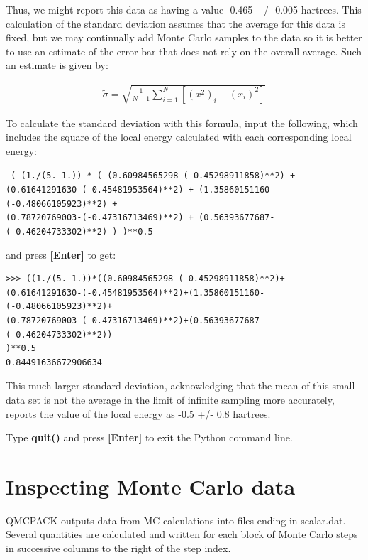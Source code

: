 Thus, we might report this data as having a value -0.465 +/- 0.005 hartrees.
This calculation of the standard deviation assumes that the average for this
data is fixed, but we may continually add Monte Carlo samples to the data so it
is better to use an estimate of the error bar that does not rely on the overall
average.  Such an estimate is given by:

\begin{align}
  \tilde{\sigma} = \sqrt{\frac{1}{N-1}\sum_{i=1}^{N} \left[{(x^2)}_i - ({x_i})^2\right]}
\end{align}

To calculate the standard deviation with this formula, input the following,
which includes the square of the local energy calculated with each
corresponding local energy:

\texttt{
( (1./(5.-1.)) * ( 
(0.60984565298-(-0.45298911858)**2) + \\
(0.61641291630-(-0.45481953564)**2) + 
(1.35860151160-(-0.48066105923)**2) + \\
(0.78720769003-(-0.47316713469)**2) + 
(0.56393677687-(-0.46204733302)**2) ) 
)**0.5
}

and press \textbf{[Enter]} to get:

\begin{shaded}
\begin{verbatim}
>>> ((1./(5.-1.))*((0.60984565298-(-0.45298911858)**2)+ 
(0.61641291630-(-0.45481953564)**2)+(1.35860151160-(-0.48066105923)**2)+ 
(0.78720769003-(-0.47316713469)**2)+(0.56393677687-(-0.46204733302)**2))
)**0.5
0.84491636672906634
\end{verbatim}
\end{shaded}

This much larger standard deviation, acknowledging that the mean of this small
data set is not the average in the limit of infinite sampling more accurately,
reports the value of the local energy as -0.5 +/- 0.8 hartrees.

Type \textbf{quit()} and press \textbf{[Enter]} to exit the Python command line.

\section{Inspecting Monte Carlo data}
\label{sec:inspect_data} 

QMCPACK outputs data from MC calculations into files ending in scalar.dat.
Several quantities are calculated and written for each block of Monte Carlo
steps in successive columns to the right of the step index. 

